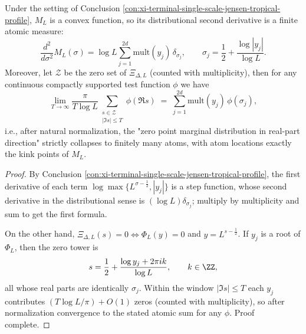 \begin{conclusion}\label{con:xi-terminal-single-scale-offline-spectral-measure-atomicity}
Under the setting of Conclusion \ref{con:xi-terminal-single-scale-jensen-tropical-profile}, \(M_L\) is a convex function, so its distributional second derivative is a finite atomic measure:
\[
\frac{d^{2}}{d\sigma^{2}}M_L(\sigma)=\log L\sum_{j=1}^{2d}\mathrm{mult}(y_j)\,\delta_{\sigma_j},
\qquad
\sigma_j=\frac12+\frac{\log|y_j|}{\log L}.
\]
Moreover, let \(\mathcal Z\) be the zero set of \(\Xi_{\Delta,L}\) (counted with multiplicity), then for any continuous compactly supported test function \(\phi\) we have
\[
\lim_{T\to\infty}\frac{\pi}{T\log L}\sum_{\substack{s\in\mathcal Z\\ |\Im s|\le T}}\phi(\Re s)
\;=\;
\sum_{j=1}^{2d}\mathrm{mult}(y_j)\,\phi(\sigma_j),
\]
i.e., after natural normalization, the "zero point marginal distribution in real-part direction" strictly collapses to finitely many atoms, with atom locations exactly the kink points of \(M_L\).
\end{conclusion}
\begin{proof}[Proof]
By Conclusion \ref{con:xi-terminal-single-scale-jensen-tropical-profile},
the first derivative of each term \(\log\max\{L^{\sigma-\frac12},|y_j|\}\) is a step function,
whose second derivative in the distributional sense is \((\log L)\delta_{\sigma_j}\); multiply by multiplicity and sum to get the first formula.
\par
On the other hand, \(\Xi_{\Delta,L}(s)=0\iff \Phi_L(y)=0\) and \(y=L^{s-\frac12}\).
If \(y_j\) is a root of \(\Phi_L\), then the zero tower is
\[
s=\frac12+\frac{\log y_j+2\pi i k}{\log L},\qquad k\in\ZZ,
\]
all whose real parts are identically \(\sigma_j\).
Within the window \(|\Im s|\le T\) each \(y_j\) contributes \( (T\log L/\pi)+O(1)\) zeros (counted with multiplicity), so after normalization convergence to the stated atomic sum for any \(\phi\). Proof complete.
\end{proof}

